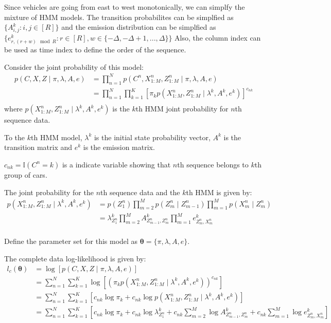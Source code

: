 \documentclass[12pt]{article}
\newenvironment{problem}[2][Problem]{\begin{trivlist}
\item[\hskip \labelsep {\bfseries #1}\hskip \labelsep {\bfseries #2.}]}{\end{trivlist}}
\begin{document}
\begin{problem}{2.7.21}
Since vehicles are going from east to west monotonically, we can simplfy the
mixture of HMM models. The transition probabilites can be simplfied as 
$\{A^{k}_{i,j}: i, j \in [R]\}$ and the emission distribution can be simplfied as
$\{e^{k}_{r,(r+w)\mod R}: r \in [R], w \in \{-\Delta, -\Delta+1, ..., \Delta\}\}$
Also, the column index can be used as time index to define the order of the sequence.

Consider the joint probability of this model:
\begin{align*}
    p(C, X, Z \mid \pi, \lambda, A, e) 
    &= \prod_{n=1}^{N} p(C^{n}, X^n_{1:M}, Z^n_{1:M} \mid \pi, \lambda, A, e) \\
    &= \prod_{n=1}^{N} \prod_{k=1}^{K} [\pi_k p(X^n_{1:M}, Z^n_{1:M}\mid \lambda^k, A^{k}, e^{k})]^{c_{nk}} \\
\end{align*}
where $p(X^n_{1:M}, Z^n_{1:M}\mid \lambda^k, A^{k}, e^{k})$ is the $k$th HMM joint probability
for $n$th sequence data.


To the $k$th HMM model, $\lambda^k$ is the initial state probability vector,
$A^k$ is the transition matrix and $e^k$ is the emission matrix.

$c_{nk} = \mathbb{I}(C^n = k)$ is a indicate variable showing that $n$th sequence
belongs to $k$th group of cars.

The joint probability for the $n$th sequence data and the $k$th HMM is given by:
\begin{align*}
    p(X^n_{1:M}, Z^n_{1:M}\mid \lambda^k, A^{k}, e^{k})
    &= p(Z^n_1)\prod_{m=2}^{M}p(Z^n_m\mid Z^n_{m-1})\prod_{m=1}^{M}p(X^{n}_m\mid Z^n_m) \\
    &= \lambda^k_{Z^n_1}\prod_{m=2}^{M}A^k_{Z^n_{m-1},Z^n_m}\prod_{m=1}^{M}e^k_{Z^n_{m},X^n_m}\\
\end{align*}

Define the parameter set for this model as $\bm{\theta} = \{ \pi, \lambda, A, e\}$.

The complete data log-likelihood is given by:
\begin{align*}
    l_c(\bm{\theta}) &= \log [p(C, X, Z \mid \pi, \lambda, A, e)] \\
    &= \sum_{n=1}^{N} \sum_{k=1}^{K} 
        \log [(\pi_k p(X^n_{1:M}, Z^n_{1:M}\mid \lambda^k, A^{k}, e^{k}))^{c_{nk}}] \\
    &= \sum_{n=1}^{N} \sum_{k=1}^{K} 
        [c_{nk}\log \pi_k + c_{nk}\log p(X^n_{1:M}, Z^n_{1:M}\mid \lambda^k, A^{k}, e^{k})]  \\
    &= \sum_{n=1}^{N} \sum_{k=1}^{K}
        [c_{nk}\log \pi_k 
        + c_{nk} \log \lambda^k_{Z^n_1}
        + c_{nk} \sum_{m=2}^{M} \log A^k_{Z^n_{m-1},Z^n_m}
        + c_{nk} \sum_{m=1}^{M} \log e^k_{Z^n_{m},X^n_m}
        ]  \\
\end{align*}


\end{problem}
\end{document}
